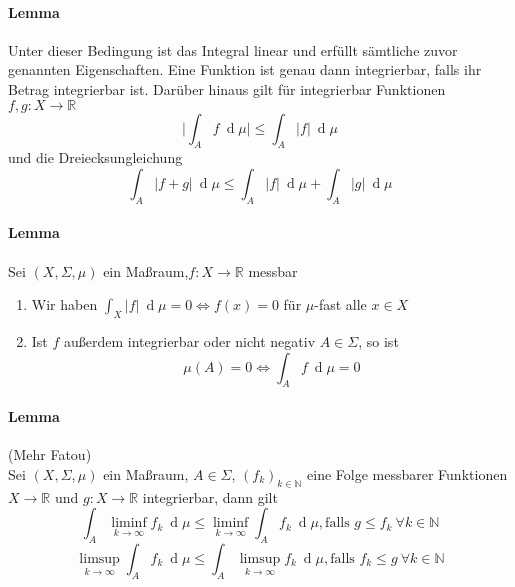 \documentclass[12pt,a4paper,fleqn]{article}
\def\d{{\operatorname{d}}}
\begin{document}
\paragraph{Lemma} Unter dieser Bedingung ist das Integral linear und erfüllt sämtliche zuvor genannten Eigenschaften. Eine Funktion ist genau dann integrierbar, falls ihr Betrag integrierbar ist. Darüber hinaus gilt für integrierbar Funktionen $f, g\colon X \rightarrow \mathbb{R}$
\begin{displaymath}
\bigg|{\int_A f\ \d\mu}\bigg| \leq \int_A \vert{f}\vert\ \d\mu 
\end{displaymath}
und die Dreiecksungleichung
\begin{displaymath}
\int_A \vert{f + g}\vert\ \d\mu \leq \int_A \vert{f}\vert\ \d\mu + \int_A \vert{g}\vert\ \d\mu
\end{displaymath}

\paragraph{Lemma} Sei $(X, \Sigma, \mu)$ ein Maßraum,$f\colon X \rightarrow \mathbb{R}$ messbar
\begin{enumerate}
\item Wir haben $\int_X \vert{f}\vert\ \d\mu = 0 \Leftrightarrow f(x) = 0$ für $\mu$-fast alle $x \in X$
\item Ist $f$ außerdem integrierbar oder nicht negativ $A \in \Sigma$, so ist 
\begin{displaymath}
\mu(A) = 0 \Leftrightarrow \int_A f\ \d\mu = 0
\end{displaymath}
\end{enumerate}

\paragraph{Lemma} (Mehr Fatou)\\
Sei $(X, \Sigma, \mu)$ ein Maßraum, $A \in \Sigma$, $(f_k)_{k \in \mathbb{N}}$ eine Folge messbarer Funktionen $X \rightarrow \mathbb{R}$ und $g\colon X \rightarrow \mathbb{R}$ integrierbar, dann gilt
\begin{displaymath}
\int_A \liminf_{k \rightarrow\infty} f_k\ \d\mu \leq \liminf_{k \rightarrow \infty} \int_A f_k\ \d\mu, \text{falls } g \leq f_k\ \forall k \in \mathbb{N}
\end{displaymath}
\begin{displaymath}
\limsup_{k \rightarrow \infty} \int_A f_k\ \d\mu \leq \int_A \limsup_{k \rightarrow \infty} f_k\ \d\mu, \text{falls } f_k \leq g\ \forall k \in \mathbb{N}
\end{displaymath}
\end{document}
